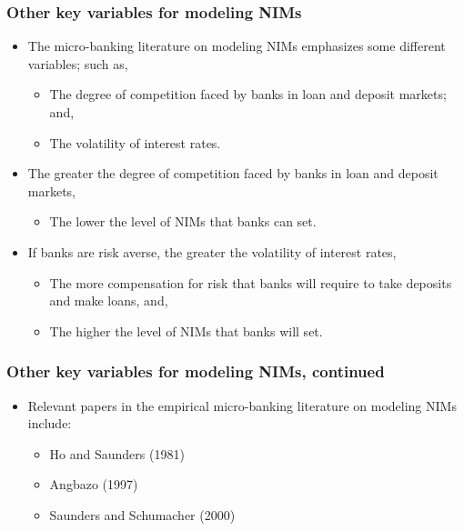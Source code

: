 \documentclass[handout]{beamer}
\begin{document}
\begin{frame}
\frametitle{Other key variables for modeling NIMs}
\begin{itemize}
\item \vspace{0.0in} The micro-banking literature on modeling NIMs emphasizes some different variables; such as,
\begin{itemize}
\item \vspace{0.05in} The degree of competition faced by banks in loan and deposit markets; and,
\item \vspace{0.05in} The volatility of interest rates.
\end{itemize}
\item\vspace{0.1in} The greater the degree of competition faced by banks in loan and deposit markets,
\begin{itemize}
\item \vspace{0.05in} The lower the level of NIMs that banks can set.
\end{itemize}
\item\vspace{0.1in} If banks are risk averse, the greater the volatility of interest rates,
\begin{itemize}
\item \vspace{0.05in} The more compensation for risk that banks will require to take deposits and make loans, and,
\item \vspace{0.05in} The higher the level of NIMs that banks will set.
\end{itemize}
\end{itemize}
\end{frame}

\begin{frame}
\frametitle{Other key variables for modeling NIMs, continued}
\begin{itemize}
\item \vspace{0.15in} Relevant papers in the empirical micro-banking literature on modeling NIMs include:
\begin{itemize}
\item \vspace{0.15in} Ho and Saunders (1981)
\item \vspace{0.15in} Angbazo (1997)
\item \vspace{0.15in} Saunders and Schumacher (2000)
\end{itemize}

\end{itemize}
\end{frame}
\end{document}
